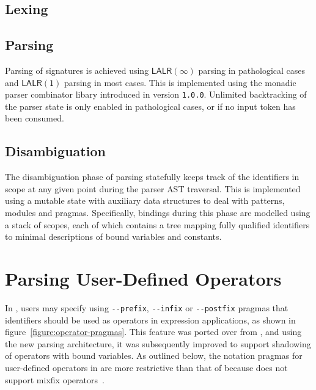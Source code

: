 \subsection{Lexing}


\subsection{Parsing}

Parsing of \Beluga signatures is achieved using $ \mathsf{LALR(\infty)} $ parsing in pathological cases and $ \mathsf{LALR(1)} $ parsing in most cases.
This is implemented using the monadic parser combinator libary introduced in \Beluga version \texttt{1.0.0}.
Unlimited backtracking of the parser state is only enabled in pathological cases, or if no input token has been consumed.


\subsection{Disambiguation}

The disambiguation phase of parsing statefully keeps track of the identifiers in scope at any given point during the parser \ac{AST} traversal.
This is implemented using a mutable state with auxiliary data structures to deal with patterns, modules and pragmas.
Specifically, bindings during this phase are modelled using a stack of scopes, each of which contains a tree mapping fully qualified identifiers to minimal descriptions of bound variables and constants.


\section{Parsing User-Defined Operators}

In \Beluga, users may specify using \verb|--prefix|, \verb|--infix| or \verb|--postfix| pragmas that identifiers should be used as operators in expression applications, as shown in figure~\ref{figure:operator-pragmas}.
This feature was ported over from \Twelf, and using the new parsing architecture, it was subsequently improved to support shadowing of operators with bound variables.
As outlined below, the notation pragmas for user-defined operators in \Beluga are more restrictive than that of \Agda because \Beluga does not support mixfix operators~\cite{danielsson2008parsing}.

